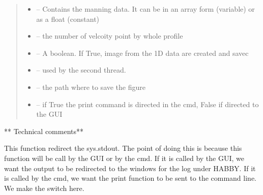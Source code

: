 \documentclass[letterpaper,10pt,english]{sphinxmanual}
\begin{document}
\begin{fulllineitems}
\begin{quote}
\begin{description}
\begin{itemize}
\item {} 
 -- Contains the manning data. It can be in an array form (variable) or as a float (constant)

\item {} 
 -- the number of velcoity point by whole profile

\item {} 
 -- A boolean. If True, image from the 1D data are created and savec

\item {} 
 -- used by the second thread.

\item {} 
 -- the path where to save the figure

\item {} 
 -- if True the print command is directed in the cmd, False if directed to the GUI

\end{itemize}

\end{description}\end{quote}

** Technical comments**

This function redirect the sys.stdout. The point of doing this is because this function will be call by the GUI or
by the cmd. If it is called by the GUI, we want the output to be redirected to the windows for the log under HABBY.
If it is called by the cmd, we want the print function to be sent to the command line. We make the switch here.

\end{fulllineitems}

\end{document}
